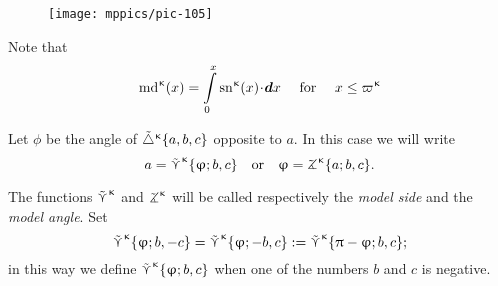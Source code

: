 {

\begin{wrapfigure}{r}{44mm}
\centering
\texttt{[image: mppics/pic-105]}
\end{wrapfigure}


Note that
\[
\mdk(x)=\int\limits_0^x
\snk(x)\cdot\dd x \quad \text{ for }\quad x\le \varpi\kappa
\]

Let $\phi$ be the angle of ${\tilde\triangle}^{\upkappa}\{a,b,c\}$  
opposite to $a$.
In this case we will write \label{page:model-side}
\[a
=
\side\kappa\{\phi;b,c\}
\quad  \text{or}\quad 
\phi
=
\tangle\mc\kappa\{a;b,c\}.\]

}

The functions $\mathop{\tilde\curlyvee}\nolimits^{\upkappa}$ and $\tangle\mc\kappa$ will be called respectively the \emph{model side} and the \emph{model angle}.
Set 
\[
\mathop{\tilde\curlyvee}\nolimits^{\upkappa}\{\upvarphi;b,-c\}
=\mathop{\tilde\curlyvee}\nolimits^{\upkappa}\{\upvarphi;-b,c\}
:=\mathop{\tilde\curlyvee}\nolimits^{\upkappa}\{\uppi-\upvarphi;b,c\};\]
in this way we define $\mathop{\tilde\curlyvee}\nolimits^{\upkappa}\{\upvarphi;b,c\}$ when one of the numbers  $b$ and $c$ is negative. %


